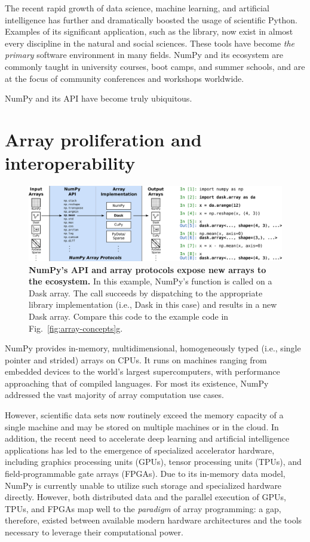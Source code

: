 The recent rapid growth of data science, machine learning, and
artificial intelligence has further and dramatically boosted the usage of
scientific Python.  Examples of its significant application, such as the
 library, now exist in almost every discipline in the natural and social
sciences.  These tools have become \emph{the primary}
software environment in many fields.  NumPy and its ecosystem are commonly
taught in university courses, boot camps, and summer schools, and are
at the focus of community conferences and workshops worldwide.

NumPy and its API have become truly ubiquitous.

\section*{Array proliferation and interoperability}

\begin{figure}
  \centering
  \includegraphics[width=\textwidth]{static/sketches/protocol}

  \caption{\textbf{NumPy's API and array protocols expose new arrays to the ecosystem.}
     In this example, NumPy's  function is called on a Dask
     array.  The call succeeds by dispatching to the appropriate library implementation
     (i.e., Dask in this case) and results in a new Dask array.  Compare this
     code to the example code in Fig.~\ref{fig:array-concepts}g.
  }\label{fig:array-protocol}

\end{figure}

NumPy provides in-memory, multidimensional, homogeneously typed
(i.e., single pointer and strided) arrays on CPUs.  It runs on machines
ranging from embedded devices to the world's largest supercomputers,
with performance approaching that of compiled languages.
For most its existence, NumPy addressed the vast majority of
array computation use cases.

However, scientific data sets now routinely exceed the memory capacity of a single machine and may
be stored on multiple machines or in the cloud.
In addition, the recent need to accelerate deep learning and artificial intelligence applications
has led to the emergence of specialized accelerator hardware,
including graphics processing units (GPUs), tensor processing units (TPUs),
and field-programmable gate arrays (FPGAs).
Due to its in-memory data model, NumPy is currently unable to
utilize such storage and specialized hardware directly.  However, both
distributed data and the parallel execution of GPUs, TPUs, and FPGAs map well
to the \emph{paradigm} of array programming: a gap, therefore, existed between
available modern hardware architectures and the tools necessary to
leverage their computational power.

